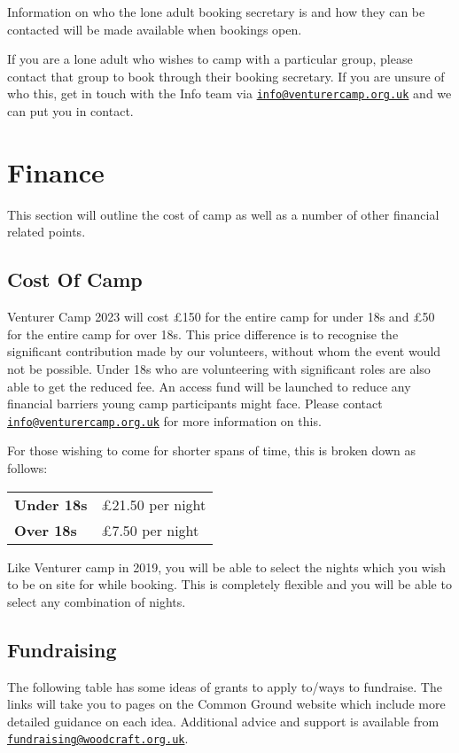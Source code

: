 \documentclass[a4paper, 10pt]{report}
\begin{document}
Information on who the lone adult booking secretary is and how they can be contacted will be made available when bookings open.

If you are a lone adult who wishes to camp with a particular group, please contact that group to book through their booking secretary. If you are unsure of who this, get in touch with the Info team via \href{mailto:info@venturercamp.org.uk}{\texttt{info@venturercamp.org.uk}} and we can put you in contact.

\chapter{Finance}
This section will outline the cost of camp as well as a number of other financial related points.
\section{Cost Of Camp}
Venturer Camp 2023 will cost £150 for the entire camp for under 18s and £50 for the entire camp for over 18s. This price difference is to recognise the significant contribution made by our volunteers, without whom the event would not be possible. Under 18s who are volunteering with significant roles are also able to get the reduced fee. An access fund will be launched to reduce any financial barriers young camp participants might face. Please contact \href{mailto:info@venturercamp.org.uk}{\texttt{info@venturercamp.org.uk}} for more information on this.

For those wishing to come for shorter spans of time, this is broken down as follows:
\begin{table}[H]
    \centering
\begin{tabularx}{\textwidth}{ll}
    \textbf{Under 18s} & £21.50 per night \\
    \textbf{Over 18s} & £7.50 per night 
\end{tabularx}
\end{table}
Like Venturer camp in 2019, you will be able to select the nights which you wish to be on site for while booking. This is completely flexible and you will be able to select any combination of nights.

\section{Fundraising}
The following table has some ideas of grants to apply to/ways to fundraise. The links will take you to pages on the Common Ground website which include more detailed guidance on each idea. Additional advice and support is available from \href{mailto:fundraising@woodcraft.org.uk}{\texttt{fundraising@woodcraft.org.uk}}. 
\end{document}
